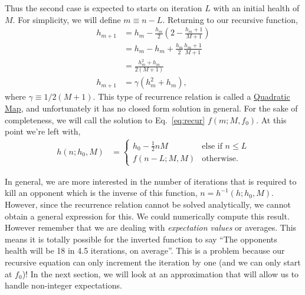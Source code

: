 			Thus the second case is expected to starts on iteration $L$ with an initial health of $M$. For simplicity, we will define $m\equiv n-L$. Returning to our recursive function,
			\begin{align}
				h_{m+1} &= h_{m} - \frac{h_m}{2}\left(2 - \frac{h_m + 1}{M+1}\right) \\
				&= h_{m} - h_m + \frac{h_m}{2}\frac{h_m + 1}{M+1} \\
				&= \frac{h_m^2 + h_m}{2(M+1)} \\
				h_{m+1} &= \gamma (h_m^2 + h_m), \label{eq:recur}
			\end{align}
			where $\gamma\equiv1 / 2(M+1)$. This type of recurrence relation is called a \href{http://mathworld.wolfram.com/QuadraticMap.html}{Quadratic Map}, and unfortunately it has no closed form solution in general. For the sake of completeness, we will call the solution to Eq.~\ref{eq:recur} $f(m; M, f_0)$. At this point we're left with,
			\begin{align}
					h(n; h_0, M) &=  \begin{cases}
					h_0 - \frac{1}{2}nM &\text{else if $n \le L$} \\
					f(n - L; M, M) &\text{otherwise}.
				\end{cases}
			\end{align}

			In general, we are more interested in the number of iterations that is required to kill an opponent which is the inverse of this function, $n=h^{-1}(h; h_0, M)$. However, since the recurrence relation cannot be solved analytically, we cannot obtain a general expression for this. We could numerically compute this result. However remember that we are dealing with \emph{expectation values} or averages. This means it is totally possible for the inverted function to say ``The opponents health will be 18 in 4.5 iterations, on average''. This is a problem because our recursive equation can only increment the iteration by one (and we can only start at $f_0$)! In the next section, we will look at an approximation that will allow us to handle non-integer expectations.

